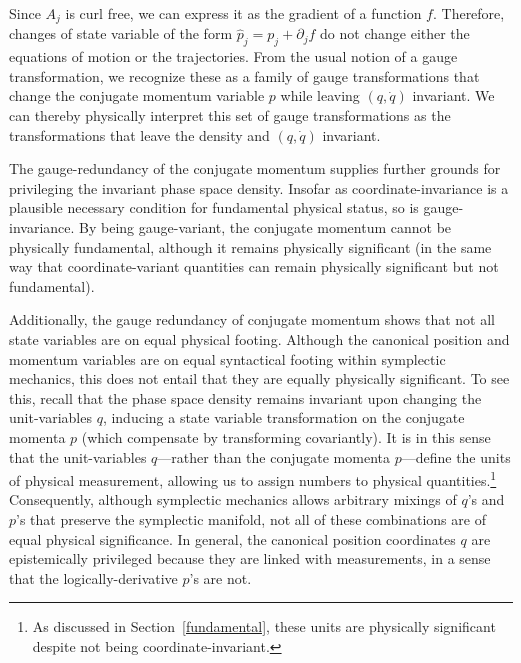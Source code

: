 \documentclass[letterpaper]{article}
\begin{document}
Since $A_j$ is curl free, we can express it as the gradient of a function $f$. Therefore, changes of state variable of the form $\hat{p}_j = p_j + \partial_j f$ do not change either the equations of motion or the trajectories. From the usual notion of a gauge transformation, we recognize these as a family of gauge transformations that change the conjugate momentum variable $p$ while leaving $(q,\dot{q}) $ invariant. We can thereby physically interpret this set of gauge transformations as the transformations that leave the density and $(q,\dot{q}) $ invariant.

The gauge-redundancy of the conjugate momentum supplies further grounds for privileging the invariant phase space density. Insofar as coordinate-invariance is a plausible necessary condition for fundamental physical status, so is gauge-invariance. By being gauge-variant, the conjugate momentum cannot be physically fundamental, although it remains physically significant (in the same way that coordinate-variant quantities can remain physically significant but not fundamental).

Additionally, the gauge redundancy of conjugate momentum shows that not all state variables are on equal physical footing. Although the canonical position and momentum variables are on equal syntactical footing within symplectic mechanics, this does not entail that they are equally physically significant. To see this, recall that the phase space density remains invariant upon changing the unit-variables $q$, inducing a state variable transformation on the conjugate momenta $p$ (which compensate by transforming covariantly). It is in this sense that the unit-variables $q$---rather than the conjugate momenta $p$---define the units of physical measurement, allowing us to assign numbers to physical quantities.\footnote{As discussed in Section~\ref{fundamental}, these units are physically significant despite not being coordinate-invariant.} Consequently, although symplectic mechanics allows arbitrary mixings of $q$'s and $p$'s that preserve the symplectic manifold, not all of these combinations are of equal physical significance. In general, the canonical position coordinates $q$ are epistemically privileged because they are linked with measurements, in a sense that the logically-derivative $p$'s are not. 



\end{document}
